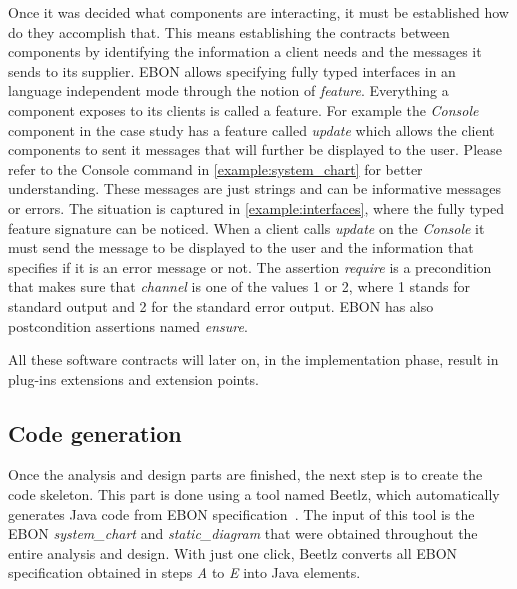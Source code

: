 \documentclass[conference]{IEEEtran}
\newcommand{\note}[1]{\todo[inline,color=red!40]{#1}}
\begin{document}



Once it was decided what components are interacting, it must be
established how do they accomplish that. This means establishing the
contracts between components by identifying the information a client
needs and the messages it sends to its supplier. EBON allows
specifying fully typed interfaces in an language independent mode
through the notion of \emph{feature}. Everything a component exposes
to its clients is called a feature. For example the \emph{Console}
component in the case study has a feature called \emph{update} which
allows the client components to sent it messages that will further be
displayed to the user. Please refer to the Console command in
\autoref{example:system_chart} for better understanding. These
messages are just strings and can be informative messages or errors.
The situation is captured in \autoref{example:interfaces}, where the
fully typed feature signature can be noticed. When a client calls
\emph{update} on the \emph{Console} it must send the message to be
displayed to the user and the information that specifies if it is an
error message or not. The assertion \emph{require} is a precondition
that makes sure that \emph{channel} is one of the values 1 or 2, where
1 stands for standard output and 2 for the standard error output. EBON
has also postcondition assertions named \emph{ensure}.

All these software contracts will later on, in the implementation phase,
result in plug-ins extensions and extension points.

%
\subsection{Code generation}
\label{sec:code-generation}

Once the analysis and design parts are finished, the next step is to
create the code skeleton. This part is done using a tool named Beetlz,
which automatically generates Java code from EBON
specification~\cite{Darulova09}.  The input of this tool is the EBON
\emph{system\_chart} and \emph{static\_diagram} that were obtained
throughout the entire analysis and design. With just one click, Beetlz
converts all EBON specification obtained in steps \emph{A} to \emph{E}
into Java elements.

\end{document}
